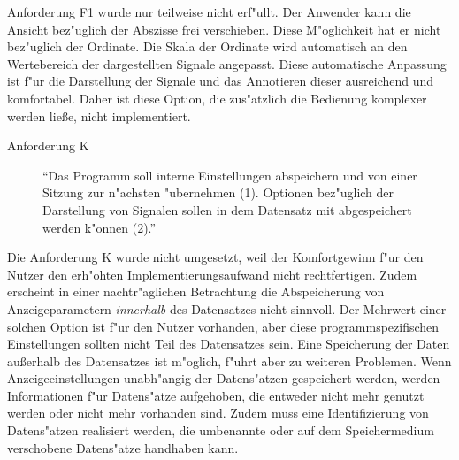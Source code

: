 Anforderung F1 wurde nur teilweise nicht erf"ullt.
Der Anwender kann die Ansicht bez"uglich der Abszisse frei verschieben.
Diese M"oglichkeit hat er nicht bez"uglich der Ordinate.
Die Skala der Ordinate wird automatisch an den Wertebereich der dargestellten Signale angepasst.
Diese automatische Anpassung ist f"ur die Darstellung der Signale und das Annotieren dieser ausreichend und komfortabel.
Daher ist diese Option, die zus"atzlich die Bedienung komplexer werden lie{\ss}e, nicht implementiert.


\begin{description}
	\item[Anforderung K] "`Das Programm soll interne Einstellungen abspeichern und von einer Sitzung zur n"achsten "ubernehmen (1).
					   Optionen bez"uglich der Darstellung von Signalen sollen in dem Datensatz mit abgespeichert werden k"onnen (2)."'
\end{description}

Die Anforderung K wurde nicht umgesetzt, weil der Komfortgewinn f"ur den Nutzer den erh"ohten Implementierungsaufwand nicht rechtfertigen.
Zudem erscheint in einer nachtr"aglichen Betrachtung die Abspeicherung von Anzeigeparametern \emph{innerhalb} des Datensatzes nicht sinnvoll.
Der Mehrwert einer solchen Option ist f"ur den Nutzer vorhanden, aber diese programmspezifischen Einstellungen sollten nicht Teil des Datensatzes sein.
Eine Speicherung der Daten au{\ss}erhalb des Datensatzes ist m"oglich, f"uhrt aber zu weiteren Problemen.
Wenn Anzeigeeinstellungen unabh"angig der Datens"atzen gespeichert werden, werden Informationen f"ur Datens"atze aufgehoben, die entweder nicht mehr genutzt werden oder nicht mehr vorhanden sind.
Zudem muss eine Identifizierung von Datens"atzen realisiert werden, die umbenannte oder auf dem Speichermedium verschobene Datens"atze handhaben kann.


